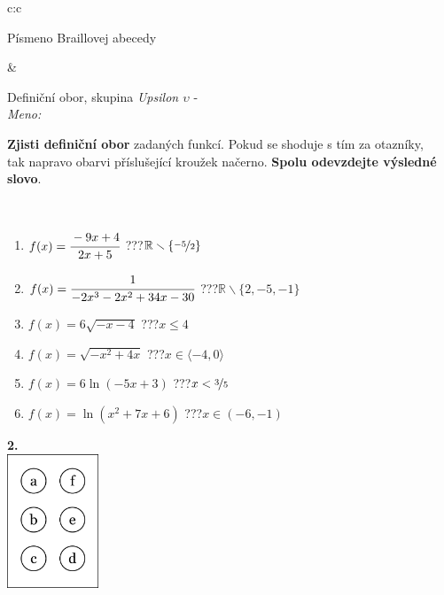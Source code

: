 \documentclass[10pt]{report}
\begin{document}
\begin{tabular}{c:c}
\begin{minipage}[c][104.5mm][t]{0.5\linewidth}
\begin{center}
\begin{minipage}{0.20\linewidth}
\begin{center}
{\small Písmeno Braillovej abecedy}
\end{center}
\end{minipage}
\end{center}
\end{minipage}
&
\begin{minipage}[c][104.5mm][t]{0.5\linewidth}
\begin{center}
\vspace{7mm}
{\huge Definiční obor, skupina \textit{Upsilon $\upsilon$} -}\\[5mm]
\textit{Meno:}\phantom{xxxxxxxxxxxxxxxxxxxxxxxxxxxxxxxxxxxxxxxxxxxxxxxxxxxxxxxxxxxxxxxxx}\\[5mm]
\begin{minipage}{0.95\linewidth}
\textbf{Zjisti definiční obor} zadaných funkcí. Pokud se shoduje s tím za otazníky,\\tak napravo obarvi příslušející kroužek načerno. \textbf{Spolu odevzdejte výsledné slovo}.
\end{minipage}
\\[1mm]
\begin{minipage}{0.79\linewidth}
\begin{center}
\begin{varwidth}{\linewidth}
\begin{enumerate}
\normalsizerrr
\item $f(x)=\cfrac{-9x+4}{2x+5}$\quad \dotfill\; ???\;\dotfill \quad $\mathbb{R}\smallsetminus\{\nicefrac{-5}{2}\}$
\item $f(x)=\cfrac{1}{-2x^3-2x^2+34x-30}$\quad \dotfill\; ???\;\dotfill \quad $\mathbb{R}\smallsetminus\{2,-5,-1\}$
\item $f(x)=6\sqrt{-x-4}$\quad \dotfill\; ???\;\dotfill \quad $x\leq4$
\item $f(x)=\sqrt{-x^2+4x}$\quad \dotfill\; ???\;\dotfill \quad $x\in\langle-4 , 0\rangle$
\item $f(x)=6\ln{(-5x+3)}$\quad \dotfill\; ???\;\dotfill \quad $x<\nicefrac{3}{5}$
\item $f(x)=\ln{(x^2+7x+6)}$\quad \dotfill\; ???\;\dotfill \quad $x\in(-6 , -1)$
\end{enumerate}
\end{varwidth}
\end{center}
\end{minipage}
\begin{minipage}{0.20\linewidth}
\begin{center}
{\Huge\bfseries 2.} \\[2mm]
\includegraphics[height=40mm]{../images/braille.png}

\end{center}
\end{minipage}
\end{center}
\end{minipage}
\end{tabular}
\end{document}
